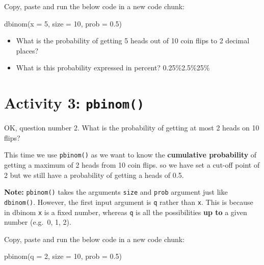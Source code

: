 \documentclass[
  oneside]{book}
\newenvironment{Shaded}{\begin{snugshade}}{\end{snugshade}}
\newcommand{\AttributeTok}[1]{\textcolor[rgb]{0.77,0.63,0.00}{#1}}
\newcommand{\DecValTok}[1]{\textcolor[rgb]{0.00,0.00,0.81}{#1}}
\newcommand{\FloatTok}[1]{\textcolor[rgb]{0.00,0.00,0.81}{#1}}
\newcommand{\FunctionTok}[1]{\textcolor[rgb]{0.00,0.00,0.00}{#1}}
\newcommand{\NormalTok}[1]{#1}
\providecommand{\tightlist}{%
  \setlength{\itemsep}{0pt}\setlength{\parskip}{0pt}}
\begin{document}
Copy, paste and run the below code in a new code chunk:

\begin{Shaded}
\begin{Highlighting}[]
\FunctionTok{dbinom}\NormalTok{(}\AttributeTok{x =} \DecValTok{5}\NormalTok{, }\AttributeTok{size =} \DecValTok{10}\NormalTok{, }\AttributeTok{prob =} \FloatTok{0.5}\NormalTok{)}
\end{Highlighting}
\end{Shaded}

\begin{itemize}
\tightlist
\item
  What is the probability of getting 5 heads out of 10 coin flips to 2 decimal places? \\
\item
  What is this probability expressed in percent? 0.25\%2.5\%25\%
\end{itemize}

\hypertarget{activity-3-pbinom}{%
\section{\texorpdfstring{Activity 3: \texttt{pbinom()}}{Activity 3: pbinom()}}\label{activity-3-pbinom}}

OK, question number 2. What is the probability of getting at most 2 heads on 10 flips?

This time we use \texttt{pbinom()} as we want to know the \textbf{cumulative probability} of getting a maximum of 2 heads from 10 coin flips. so we have set a cut-off point of 2 but we still have a probability of getting a heads of 0.5.

\textbf{Note:} \texttt{pbinom()} takes the arguments \texttt{size} and \texttt{prob} argument just like \texttt{dbinom()}. However, the first input argument is \texttt{q} rather than \texttt{x}. This is because in dbinom \texttt{x} is a fixed number, whereas \texttt{q} is all the possibilities \textbf{up to} a given number (e.g.~0, 1, 2).

Copy, paste and run the below code in a new code chunk:

\begin{Shaded}
\begin{Highlighting}[]
\FunctionTok{pbinom}\NormalTok{(}\AttributeTok{q =} \DecValTok{2}\NormalTok{, }\AttributeTok{size =} \DecValTok{10}\NormalTok{, }\AttributeTok{prob =} \FloatTok{0.5}\NormalTok{)}
\end{Highlighting}
\end{Shaded}
\end{document}
